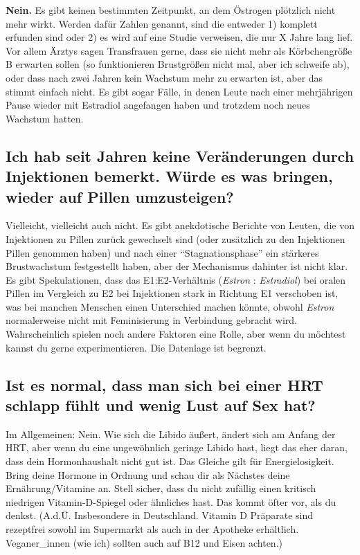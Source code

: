 \documentclass{article}
\begin{document}
\textbf{Nein.} Es gibt keinen bestimmten Zeitpunkt, an dem Östrogen plötzlich nicht mehr wirkt. Werden dafür Zahlen genannt, sind die entweder 1) komplett erfunden sind oder 2) es wird auf eine Studie verweisen, die nur X Jahre lang lief. Vor allem Ärztys sagen Transfrauen gerne, dass sie nicht mehr als Körbchengröße B erwarten sollen (so funktionieren Brustgrößen nicht mal, aber ich schweife ab), oder dass nach zwei Jahren kein Wachstum mehr zu erwarten ist, aber das stimmt einfach nicht. Es gibt sogar Fälle, in denen Leute nach einer mehrjährigen Pause wieder mit Estradiol angefangen haben und trotzdem noch neues Wachstum hatten.

\subsection{Ich hab seit Jahren keine Veränderungen durch Injektionen bemerkt. Würde es was bringen, wieder auf Pillen umzusteigen?}

Vielleicht, vielleicht auch nicht. Es gibt anekdotische Berichte von Leuten, die von Injektionen zu Pillen zurück gewechselt sind (oder zusätzlich zu den Injektionen Pillen genommen haben) und nach einer “Stagnationsphase” ein stärkeres Brustwachstum festgestellt haben, aber der Mechanismus dahinter ist nicht klar. Es gibt Spekulationen, dass das E1:E2-Verhältnis (\textit{Estron} : \textit{Estradiol}) bei oralen Pillen im Vergleich zu E2 bei Injektionen stark in Richtung E1 verschoben ist, was bei manchen Menschen einen Unterschied machen könnte, obwohl \textit{Estron} normalerweise nicht mit Feminisierung in Verbindung gebracht wird. Wahrscheinlich spielen noch andere Faktoren eine Rolle, aber wenn du möchtest kannst du gerne experimentieren. Die Datenlage ist begrenzt.

\subsection{Ist es normal, dass man sich bei einer HRT schlapp fühlt und wenig Lust auf Sex hat?}

Im Allgemeinen: Nein. Wie sich die Libido äußert, ändert sich am Anfang der HRT, aber wenn du eine ungewöhnlich geringe Libido hast, liegt das eher daran, dass dein Hormonhaushalt nicht gut ist. Das Gleiche gilt für Energielosigkeit. Bring deine Hormone in Ordnung und schau dir als Nächstes deine Ernährung/Vitamine an. Stell sicher, dass du nicht zufällig einen kritisch niedrigen Vitamin-D-Spiegel oder ähnliches hast. Das kommt öfter vor, als du denkst. (A.d.Ü. Insbesondere in Deutschland. Vitamin D Präparate sind rezeptfrei sowohl im Supermarkt als auch in der Apotheke erhältlich. Veganer\_innen (wie ich) sollten auch auf B12 und Eisen achten.)
\end{document}
